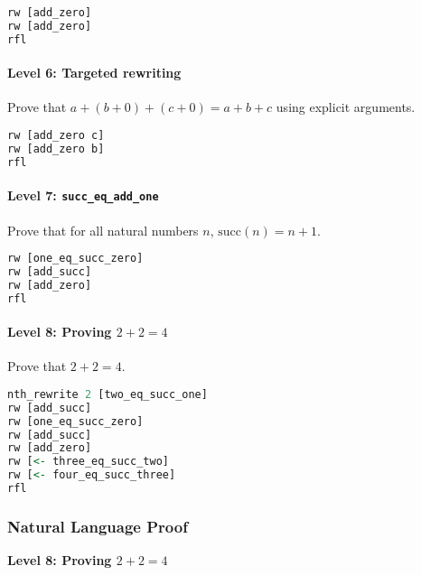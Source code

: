 \documentclass{article}
\theoremstyle{theorem}
\theoremstyle{definition}
\theoremstyle{remark}
\begin{document}
\begin{lstlisting}[language=haskell]
rw [add_zero]
rw [add_zero]
rfl
\end{lstlisting}

\paragraph{Level 6: Targeted rewriting}
Prove that $a + (b + 0) + (c + 0) = a + b + c$ using explicit arguments.

\begin{lstlisting}[language=haskell]
rw [add_zero c]
rw [add_zero b]
rfl
\end{lstlisting}

\paragraph{Level 7: \texttt{succ\_eq\_add\_one}}
Prove that for all natural numbers $n$, $\text{succ}(n) = n + 1$.

\begin{lstlisting}[language=haskell]
rw [one_eq_succ_zero]
rw [add_succ]
rw [add_zero]
rfl
\end{lstlisting}

\paragraph{Level 8: Proving $2 + 2 = 4$}
Prove that $2 + 2 = 4$.

\begin{lstlisting}[language=haskell]
nth_rewrite 2 [two_eq_succ_one]
rw [add_succ]
rw [one_eq_succ_zero]
rw [add_succ]
rw [add_zero]
rw [<- three_eq_succ_two]
rw [<- four_eq_succ_three]
rfl
\end{lstlisting}

\subsubsection{Natural Language Proof}

\textbf{Level 8: Proving $2 + 2 = 4$}
\end{document}
